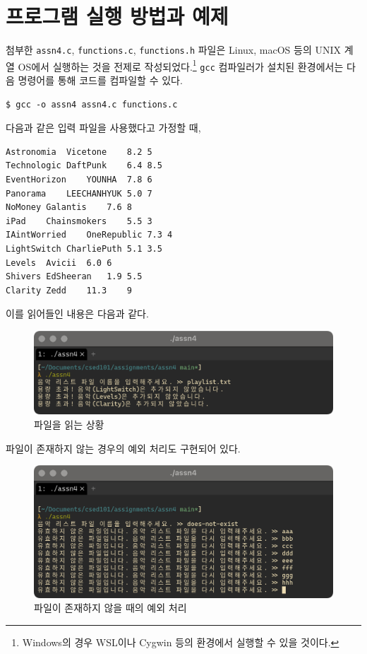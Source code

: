\documentclass[titlepage]{article}
\begin{document}
\section{프로그램 실행 방법과 예제}

첨부한 \texttt{assn4.c}, \texttt{functions.c}, \texttt{functions.h} 파일은 Linux, macOS 등의 UNIX 계열 OS에서 실행하는 것을 전제로 작성되었다.\footnote{Windows의 경우 WSL이나 Cygwin 등의 환경에서 실행할 수 있을 것이다.} \texttt{gcc} 컴파일러가 설치된 환경에서는 다음 명령어를 통해 코드를 컴파일할 수 있다.

\begin{lstlisting}
$ gcc -o assn4 assn4.c functions.c
\end{lstlisting}

다음과 같은 입력 파일을 사용했다고 가정할 때,

\begin{lstlisting}
Astronomia	Vicetone	8.2	5
Technologic	DaftPunk	6.4	8.5
EventHorizon	YOUNHA	7.8	6
Panorama	LEECHANHYUK	5.0	7
NoMoney	Galantis	7.6	8
iPad	Chainsmokers	5.5	3
IAintWorried	OneRepublic	7.3	4
LightSwitch	CharliePuth	5.1	3.5
Levels	Avicii	6.0	6
Shivers	EdSheeran	1.9	5.5
Clarity	Zedd	11.3	9
\end{lstlisting}

이를 읽어들인 내용은 다음과 같다.

\begin{figure}[H]
  \centering
  \includegraphics[width=0.7\linewidth]{file_load.png}
  \caption{파일을 읽는 상황}
\end{figure}

파일이 존재하지 않는 경우의 예외 처리도 구현되어 있다.

\begin{figure}[H]
  \centering
  \includegraphics[width=0.7\linewidth]{file_load_validation.png}
  \caption{파일이 존재하지 않을 때의 예외 처리}
\end{figure}
\end{document}
